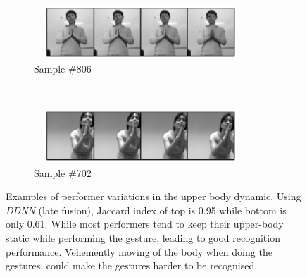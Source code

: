 \begin{figure}[t]
        \centering
        \begin{subfigure}[c]{.5\textwidth}
        \centering
                \includegraphics[width=8cm,height=2cm, clip]{images/original/original_images_gray_body_9combinato_stable.png}
                \caption{Sample \#806}
        \end{subfigure}%
        \\
        \begin{subfigure}[c]{0.5\textwidth}
        \centering
                \includegraphics[width=8cm,height=2cm, clip]{images/original/original_images_gray_body_9combinato_unstable.png}
                \caption{Sample \#702}
        \end{subfigure}

  \caption{
Examples of performer variations in the  upper body dynamic.
Using \emph{DDNN} (late fusion), Jaccard index of top is 0.95 while bottom is only 0.61.
While most performers tend to keep their upper-body static while performing the gesture, leading to good recognition performance. Vehemently moving of the body when doing the gestures, could make the gestures harder to be recognised.
  }
\label{fig:bodydynamics}
\end{figure}



